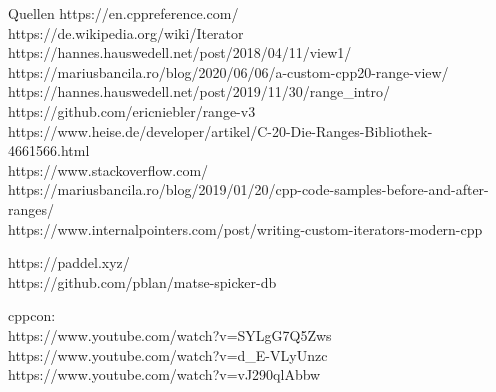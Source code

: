 \begin{frame}[allowframebreaks]{Quellen} 
    https://en.cppreference.com/ \\
    https://de.wikipedia.org/wiki/Iterator \\
    https://hannes.hauswedell.net/post/2018/04/11/view1/ \\
    https://mariusbancila.ro/blog/2020/06/06/a-custom-cpp20-range-view/ \\
    https://hannes.hauswedell.net/post/2019/11/30/range\_intro/ \\
    https://github.com/ericniebler/range-v3 \\
    https://www.heise.de/developer/artikel/C-20-Die-Ranges-Bibliothek-4661566.html \\
    https://www.stackoverflow.com/ \\
    https://mariusbancila.ro/blog/2019/01/20/cpp-code-samples-before-and-after-ranges/ \\
    https://www.internalpointers.com/post/writing-custom-iterators-modern-cpp \\

    \vspace{1em}

    https://paddel.xyz/ \\
    https://github.com/pblan/matse-spicker-db

    \vspace{1em}

    cppcon:\\
    https://www.youtube.com/watch?v=SYLgG7Q5Zws \\
    https://www.youtube.com/watch?v=d\_E-VLyUnzc \\
    https://www.youtube.com/watch?v=vJ290qlAbbw
\end{frame}